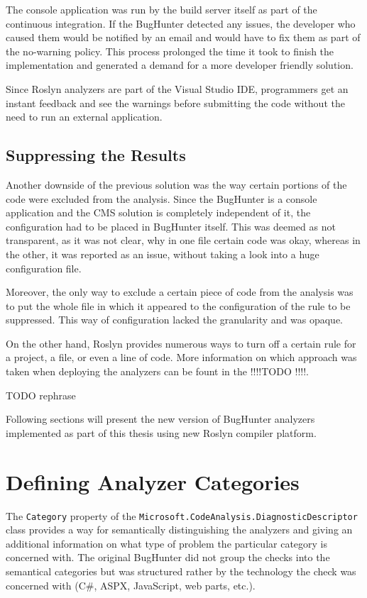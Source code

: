 \documentclass[
  digital, %
  table,   %
  lof,     %
  lot,     %
  oneside,
]{fithesis3}
\begin{document}
The console application was run by the build server itself as part of the continuous integration. If the BugHunter detected any issues, the developer who caused them would be notified by an email and would have to fix them as part of the no-warning policy. This process prolonged the time it took to finish the implementation and generated a demand for a more developer friendly solution. 

Since Roslyn analyzers are part of the Visual Studio IDE, programmers get an instant feedback and see the warnings before submitting the code without the need to run an external application.

\subsection{Suppressing the Results}
Another downside of the previous solution was the way certain portions of the code were excluded from the analysis. Since the BugHunter is a console application and the CMS solution is completely independent of it, the configuration had to be placed in BugHunter itself. This was deemed as not transparent, as it was not clear, why in one file certain code was okay, whereas in the other, it was reported as an issue, without taking a look into a huge configuration file.

Moreover, the only way to exclude a certain piece of code from the analysis was to put the whole file in which it appeared to the configuration of the rule to be suppressed. This way of configuration lacked the granularity and was opaque. 

On the other hand, Roslyn provides numerous ways to turn off a certain rule for a project, a file, or even a line of code. More information on which approach was taken when deploying the analyzers can be fount in the !!!!TODO !!!!.

\bigskip\noindent
TODO rephrase

Following sections will present the new version of BugHunter analyzers implemented as part of this thesis using new Roslyn compiler platform.

\section{Defining Analyzer Categories}
The \texttt{Category} property of the \texttt{Microsoft.CodeAnalysis.DiagnosticDescriptor} class provides a way for semantically distinguishing the analyzers and giving an additional information on what type of problem the particular category is concerned with. The original BugHunter did not group the checks into the semantical categories but was structured rather by the technology the check was concerned with (C\#, ASPX, JavaScript, web parts, etc.). 
\end{document}

